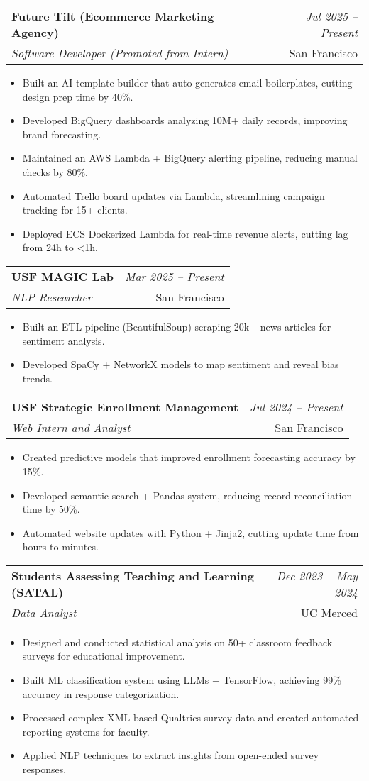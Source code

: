 \documentclass[a4paper,11pt]{article}
\makeatletter
\newcommand{\resumeItem}[1]{\item #1}
\newcommand{\resumeSubheading}[4]{\vspace{0.5mm}\item
\begin{tabular*}{0.98\textwidth}[t]{l@{\extracolsep{\fill}}r}
\textbf{#1} & \textit{\footnotesize{#4}} \\
\textit{\footnotesize{#3}} &  \footnotesize{#2}\\
\end{tabular*}
\vspace{-2.5mm}}
\newcommand{\resumeItemListStart}{\begin{justify}\begin{itemize}[leftmargin=3ex,rightmargin=2ex,itemsep=0.2mm]\small}
\newcommand{\resumeItemListEnd}{\end{itemize}\end{justify}\vspace{-0.8mm}}
\makeatother
\begin{document}
\resumeSubheading
{Future Tilt (Ecommerce Marketing Agency)}{San Francisco}
{Software Developer (Promoted from Intern)}{Jul 2025 – Present}
\vspace{-3mm}

\resumeItemListStart
  \resumeItem{Built an AI template builder that auto-generates email boilerplates, cutting design prep time by 40\%.}
  \resumeItem{Developed BigQuery dashboards analyzing 10M+ daily records, improving brand forecasting.}
  \resumeItem{Maintained an AWS Lambda + BigQuery alerting pipeline, reducing manual checks by 80\%.}
  \resumeItem{Automated Trello board updates via Lambda, streamlining campaign tracking for 15+ clients.}
  \resumeItem{Deployed ECS Dockerized Lambda for real-time revenue alerts, cutting lag from 24h to <1h.}
\resumeItemListEnd
\vspace{-3mm}

\resumeSubheading
{USF MAGIC Lab}{San Francisco}
{NLP Researcher}{Mar 2025 – Present}
\vspace{-3mm}

\resumeItemListStart
  \resumeItem{Built an ETL pipeline (BeautifulSoup) scraping 20k+ news articles for sentiment analysis.}
  \resumeItem{Developed SpaCy + NetworkX models to map sentiment and reveal bias trends.}
\resumeItemListEnd
\vspace{-3mm}

\resumeSubheading
{USF Strategic Enrollment Management}{San Francisco}
{Web Intern and Analyst}{Jul 2024 – Present}
\vspace{-3mm}

\resumeItemListStart
  \resumeItem{Created predictive models that improved enrollment forecasting accuracy by 15\%.}
  \resumeItem{Developed semantic search + Pandas system, reducing record reconciliation time by 50\%.}
  \resumeItem{Automated website updates with Python + Jinja2, cutting update time from hours to minutes.}
\resumeItemListEnd
\vspace{-3mm}


\resumeSubheading
{Students Assessing Teaching and Learning (SATAL)}{UC Merced}
{Data Analyst}{Dec 2023 – May 2024}
\vspace{-3mm}
\resumeItemListStart
  \resumeItem{Designed and conducted statistical analysis on 50+ classroom feedback surveys for educational improvement.}
  \resumeItem{Built ML classification system using LLMs + TensorFlow, achieving 99\% accuracy in response categorization.}
  \resumeItem{Processed complex XML-based Qualtrics survey data and created automated reporting systems for faculty.}
  \resumeItem{Applied NLP techniques to extract insights from open-ended survey responses.}
\resumeItemListEnd
\end{document}
